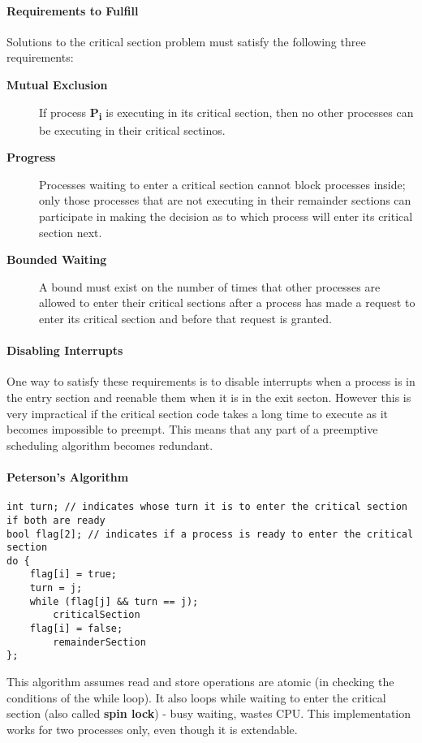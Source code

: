\documentclass{article}%
\begin{document}
\paragraph{Requirements to Fulfill}
\label{sec:orgc6815db}
Solutions to the critical section problem must satisfy the following three requirements:
\begin{description}
\item[{\textbf{Mutual Exclusion}}] If process \textbf{P\textsubscript{i}} is executing in its critical section, then no other processes can be executing in their critical sectinos.
\item[{\textbf{Progress}}] Processes waiting to enter a critical section cannot block processes inside; only those processes that are not executing in their remainder sections can participate in making the decision as to which process will enter its critical section next.
\item[{\textbf{Bounded Waiting}}] A bound must exist on the number of times that other processes are allowed to enter their critical sections after a process has made a request to enter its critical section and before that request is granted.
\end{description}

\paragraph{Disabling Interrupts}
\label{sec:orgb5b55c8}
One way to satisfy these requirements is to disable interrupts when a process is in the entry section and reenable them when it is in the exit secton.
However this is very impractical if the critical section code takes a long time to execute as it becomes impossible to preempt.
This means that any part of a preemptive scheduling algorithm becomes redundant. 

\paragraph{Peterson's Algorithm}
\label{sec:orge47fe28}
\begin{verbatim}
int turn; // indicates whose turn it is to enter the critical section if both are ready
bool flag[2]; // indicates if a process is ready to enter the critical section
do {
    flag[i] = true;
    turn = j;
    while (flag[j] && turn == j);
        criticalSection
    flag[i] = false;
        remainderSection
};
\end{verbatim}
This algorithm assumes read and store operations are atomic (in checking the conditions of the while loop).
It also loops while waiting to enter the critical section (also called \textbf{spin lock}) - busy waiting, wastes CPU.
This implementation works for two processes only, even though it is extendable.
\end{document}
